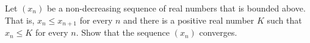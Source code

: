 \begin{comment}

\ExerciseSolution We show that $d$ is a metric If $x=(x_n)$ and $y=(y_n)$ are in $\prod_{i=1}^n X_i$, then $d(x,y) = \sqrt{ \sum_{i=1}^n d_i(x_i,y_i)^2 }$ is nonnegative by definition. Also, the symmetry of each $d_i$ implies that 
\[d(x,y) = \sqrt{ \sum_{i=1}^n d_i(x_i,y_i)^2 } = \sqrt{ \sum_{i=1}^n d_i(y_i,x_i)^2 } = d(y,x).\]
Note that $d(x,y) = 0$ if and only if $d_i(x_i,y_i) = 0$ for each $i$. But then $x_i=y_i$ for each $i$ and so $x = y$. 

Finally, let $z = (z_n)$ be in $\prod_{i=1}^n X_i$. Then
\begin{align*}
d(x,z)^2 &=  \sum_{i=1}^n d_i(x_i,z_i)^2  \\
	&\leq \sum_{i=1}^n \left(d_i(x_i,y_i) + d_i(y_i,z_i)\right)^2 \\
	&= \sum_{i=1}^n \left(d_i(x_i,y_i)^2 + 2d_i(x_i,y_i) d_i(y_i,z_i) + d_i(y_i,z_i)^2\right) \\
	&= \sum_{i=1}^n d_i(x_i,y_i)^2 + 2 \sum_{i=1}^n d_i(x_i,y_i) d_i(y_i,z_i) +  \sum_{i=1}^n d_i(y_i,z_i)^2 \\
	&= d(x,y)^2 + + 2 \sum_{i=1}^n d_i(x_i,y_i) d_i(y_i,z_i)  + d(y,z)^2 \\
	&\leq d(x,y)^2 + d(y,z)^2.
\end{align*}
Since all terms are non-negative, we conclude that 
\[d(x,z) \leq \sqrt{d(x,y)^2 + d(y,z)^2} \leq d(x,y) + d(y,z).\]

\end{comment}

\item \label{ex:Subspace_monotone_convergence} Let $(x_n)$ be a non-decreasing sequence of real numbers that is bounded above. That is, $x_n \leq x_{n+1}$ for every $n$ and there is a positive real number $K$ such that $x_n \leq K$ for every $n$. Show that the sequence $(x_n)$ converges. 

\begin{comment}

\ExerciseSolution Since the set $S = \{x_n \mid n \in \Z^+\}$ is bounded above, the set has a least upper bound $M$. We will show that $\lim x_n = M$. Let $\epsilon$ be a positive real number. If there is no number $N \in \Z^+$ such that $x_N > M - \epsilon$, then $M - \epsilon$ is an upper bound for $S$. But this contradicts the fact that $M$ is the least upper bound of $S$. So there is a positive integer $N$ such that $x_N > M - \epsilon$. Since the sequence $(x_n)$ is non-decreasing, it follows that $x_n > M - \epsilon$ for every $n \geq N$. Since $x_n \leq M$ as well for all $n \in \Z^+$ it follows that for $n \geq N$ we have 
\[d_E(x_n,M) < \epsilon.\]
Thus, $(x_n)$ converges to $M$.  

\end{comment}

